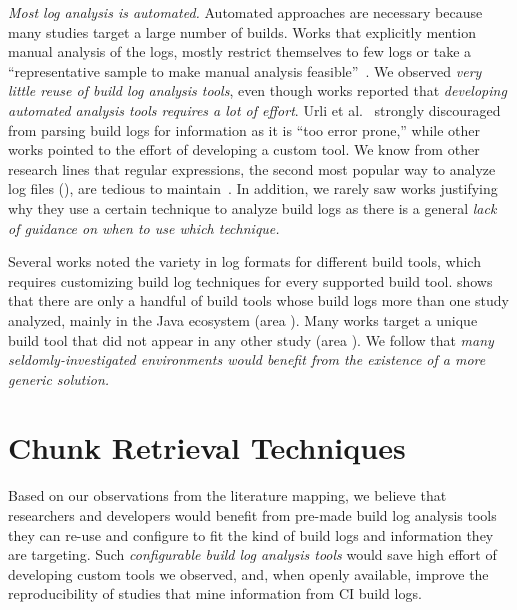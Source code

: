 \emph{Most log analysis is automated.} Automated approaches are
necessary because many studies target a large number of builds.
Works
that explicitly mention manual analysis of the logs, mostly
restrict themselves to few logs or take a ``representative sample to
make manual analysis feasible''~\citep{zolfagharinia2017not}.
We observed \emph{very little reuse of build log analysis tools},
even though works reported that
\emph{developing automated analysis tools requires a lot of effort}.
Urli et al.~\citep{urli2018design} strongly discouraged from parsing
build logs for information as it is ``too error prone,'' while other
works pointed to the effort of developing a custom tool.
We know from other research lines that regular expressions, the second
most popular way to analyze log files (),
are tedious to
maintain~\citep{michael2019regexes}.
In addition, we rarely saw works justifying why they use a certain
technique to analyze build logs as there is a general \emph{lack of
guidance on when to use which technique.}

Several works noted the variety in log formats for different build
tools, which requires customizing build log techniques for
every supported build tool.
 shows that there are only a handful of
build tools whose build logs more than one study analyzed, mainly in
the Java ecosystem (area ).
Many works target a unique build tool that did not appear in any other
study (area ).
We follow that \emph{many seldomly-investigated
environments would benefit from the
existence of a more generic solution.}



\section{Chunk Retrieval Techniques}
\label{sec:techniques}

Based on our observations from the literature mapping, we believe that
researchers and developers would benefit from pre-made
build log analysis tools they
can re-use and configure to fit the kind of build logs and information
they are targeting.
Such \emph{configurable build log analysis tools} would save high effort
of developing custom tools we observed, and, when openly available,
improve the reproducibility of studies that mine information from
CI build logs.

